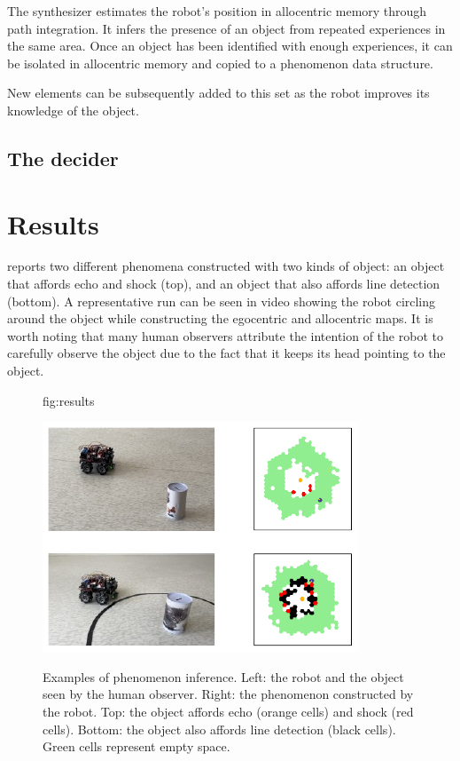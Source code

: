 \documentclass[pmlr]{jmlr}%
\begin{document}
The synthesizer estimates the robot's position in allocentric memory through path integration. 
It infers the presence of an object from repeated experiences in the same area. 
Once an object has been identified with enough experiences, it can be isolated in allocentric memory and copied to a phenomenon data structure.

New elements can be subsequently added to this set as the robot improves its knowledge of the object. 

\subsection{The decider}
\label{sec:decider}


\section{Results}

 reports two different phenomena constructed with two kinds of object: an object that affords echo and shock (top), and an object that also affords line detection (bottom).
A representative run can be seen in video \citep{titouan_knockaert_demonstration_2022} showing the robot circling around the object while constructing the egocentric and allocentric maps. 
It is worth noting that many human observers attribute the intention of the robot to carefully observe the object due to the fact that it keeps its head pointing to the object. 

\begin{figure}[htbp]
	\floatconts
	{fig:results}
	{\caption{Examples of phenomenon inference.
			  Left: the robot and the object seen by the human observer.
			  Right: the phenomenon constructed by the robot. 
			  Top: the object affords echo (orange cells) and shock (red cells). 
			  Bottom: the object also affords line detection (black cells). 
			  Green cells represent empty space.}}
	{\includegraphics[width=0.8\linewidth]{images/Figure_3_resultats}}
\end{figure}
\end{document}
